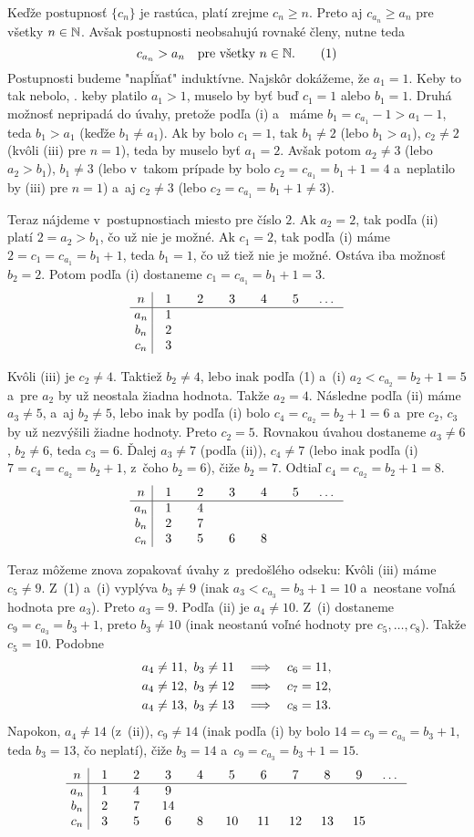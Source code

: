 {%
Keďže postupnosť $\{c_n\}$ je rastúca, platí zrejme $c_n\ge n$. Preto aj $c_{a_n}\ge a_n$ pre všetky $n\in\Bbb N$. Avšak postupnosti neobsahujú rovnaké členy, nutne teda
$$
c_{a_n}>a_n\quad\text{pre všetky $n\in\Bbb N$.}
\tag1
$$
Postupnosti budeme "napĺňať" induktívne. Najskôr dokážeme, že $a_1=1$. Keby to tak nebolo, \tj. keby platilo $a_1>1$, muselo by byť buď $c_1=1$ alebo $b_1=1$. Druhá možnosť nepripadá do úvahy, pretože podľa (i) a~ máme $b_1=c_{a_1}-1>a_1-1$, teda $b_1>a_1$ (keďže $b_1\ne a_1$).
Ak by bolo $c_1=1$, tak $b_1\ne2$ (lebo $b_1>a_1$), $c_2\ne2$ (kvôli (iii) pre $n=1$), teda by muselo byť $a_1=2$. Avšak potom $a_2\ne3$ (lebo $a_2>b_1$), $b_1\ne3$ (lebo v~takom prípade by bolo $c_2=c_{a_1}=b_1+1=4$ a~neplatilo by (iii) pre $n=1$) a~aj $c_2\ne3$ (lebo $c_2=c_{a_1}=b_1+1\ne3$).

Teraz nájdeme v~postupnostiach miesto pre číslo $2$. Ak $a_2=2$, tak podľa (ii) platí $2=a_2>b_1$, čo už nie je možné. Ak $c_1=2$, tak podľa (i) máme $2=c_1=c_{a_1}=b_1+1$, teda $b_1=1$, čo už tiež nie je možné. Ostáva iba možnosť $b_2=2$. Potom podľa (i) dostaneme $c_1=c_{a_1}=b_1+1=3$.
$$
\vbox{\offinterlineskip
       \halign{\strut\ $#$ \vrule&&\hbox to 2.5em{\hss$#$\hss}\cr
 n  & 1 & 2 & 3 & 4 & 5 & \dots\cr
\noalign{\hrule}
a_n & 1 &   &   &   &   &\cr
b_n & 2 &   &   &   &   &\cr
c_n & 3 &   &   &   &   &\cr
}}
$$

Kvôli (iii) je $c_2\ne4$. Taktiež $b_2\ne4$, lebo inak podľa (1) a~(i) $a_2<c_{a_2}=b_2+1=5$ a~pre $a_2$ by už neostala žiadna hodnota. Takže $a_2=4$. Následne podľa (ii) máme $a_3\ne5$, a~aj $b_2\ne5$, lebo inak by podľa (i) bolo $c_4=c_{a_2}=b_2+1=6$ a~pre $c_2$, $c_3$ by už nezvýšili žiadne hodnoty. Preto $c_2=5$. Rovnakou úvahou dostaneme $a_3\ne6$, $b_2\ne6$, teda $c_3=6$. Ďalej $a_3\ne7$ (podľa (ii)), $c_4\ne7$ (lebo inak podľa (i) $7=c_4=c_{a_2}=b_2+1$, z~čoho $b_2=6$), čiže $b_2=7$. Odtiaľ $c_4=c_{a_2}=b_2+1=8$.
$$
\vbox{\offinterlineskip
       \halign{\strut\ $#$ \vrule&&\hbox to 2.5em{\hss$#$\hss}\cr
 n  & 1 & 2 & 3 & 4 & 5 & \dots\cr
\noalign{\hrule}
a_n & 1 & 4  &   &  &   &\cr
b_n & 2 & 7  &   &  &   &\cr
c_n & 3 & 5  & 6 & 8&   &\cr
}}
$$

Teraz môžeme znova zopakovať úvahy z~predošlého odseku: Kvôli (iii) máme $c_5\ne9$. Z~(1) a~(i) vyplýva $b_3\ne9$ (inak $a_3<c_{a_3}=b_3+1=10$ a~neostane voľná hodnota pre $a_3$). Preto $a_3=9$. Podľa (ii) je $a_4\ne10$. Z~(i) dostaneme $c_9=c_{a_3}=b_3+1$, preto $b_3\ne 10$ (inak neostanú voľné hodnoty pre $c_5,\dots,c_8$). Takže $c_5=10$. Podobne
$$
\aligned
a_4\ne11,\ b_3\ne11\quad&\Longrightarrow\quad c_6=11,\\
a_4\ne12,\ b_3\ne12\quad&\Longrightarrow\quad c_7=12,\\
a_4\ne13,\ b_3\ne13\quad&\Longrightarrow\quad c_8=13.
\endaligned
$$
Napokon, $a_4\ne 14$ (z~(ii)), $c_9\ne14$ (inak podľa (i) by bolo $14=c_9=c_{a_3}=b_3+1$, teda $b_3=13$, čo neplatí), čiže $b_3=14$ a~$c_9=c_{a_3}=b_3+1=15$.
$$
\vbox{\offinterlineskip
       \halign{\strut\ $#$ \vrule&&\hbox to 2.5em{\hss$#$\hss}\cr
 n  & 1 & 2 & 3  & 4 & 5  & 6 & 7 & 8 & 9 &\dots\cr
\noalign{\hrule}
a_n & 1 & 4 & 9  &   &    &    &    &    &\cr
b_n & 2 & 7 & 14 &   &    &    &    &    &\cr
c_n & 3 & 5 & 6  & 8 & 10 & 11 & 12 & 13 & 15\cr
}}
$$

}
